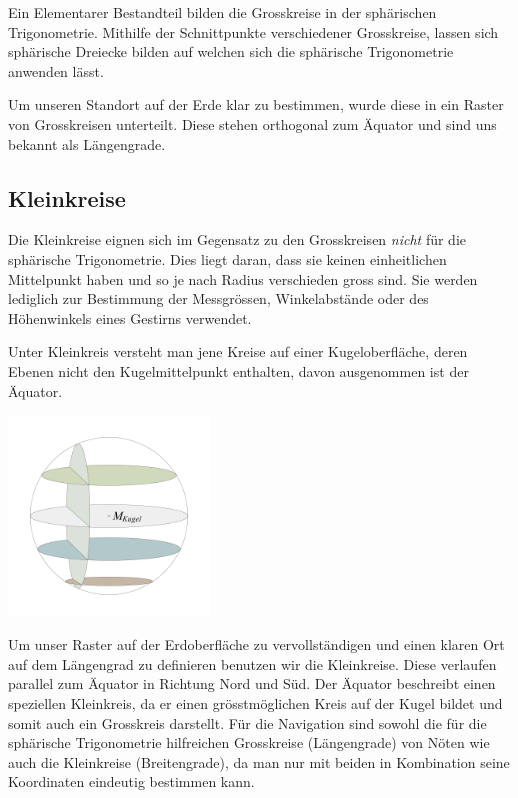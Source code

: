 \begin{refsection}
Ein Elementarer Bestandteil bilden die Grosskreise in der sphärischen Trigonometrie. Mithilfe der Schnittpunkte verschiedener Grosskreise, lassen sich sphärische Dreiecke bilden auf welchen sich die sphärische Trigonometrie anwenden lässt.

Um unseren Standort auf der Erde klar zu bestimmen, wurde diese in ein Raster von Grosskreisen unterteilt. Diese stehen orthogonal zum Äquator und sind uns bekannt als Längengrade.


\subsection{Kleinkreise}
Die Kleinkreise eignen sich im Gegensatz zu den Grosskreisen \textit{nicht} für die sphärische Trigonometrie.  Dies liegt daran, dass sie keinen einheitlichen Mittelpunkt haben und so je nach Radius verschieden gross sind.
Sie werden lediglich zur Bestimmung der Messgrössen, Winkelabstände oder des Höhenwinkels eines Gestirns verwendet. 

\begin{definition}
Unter Kleinkreis versteht man jene Kreise auf einer Kugeloberfläche, deren Ebenen nicht den Kugelmittelpunkt enthalten, davon ausgenommen ist der Äquator.
\label{skript:kugel:satz:Kleinkreis}
\end{definition} 

\begin{center}
        \includegraphics[width=0.4\textwidth]{kugel/Kleinkreise.jpg}
\end{center}

Um unser Raster auf der Erdoberfläche zu vervollständigen und einen klaren Ort auf dem Längengrad zu definieren benutzen wir die Kleinkreise. Diese verlaufen parallel zum Äquator in Richtung Nord und Süd. Der Äquator beschreibt einen speziellen Kleinkreis, da er einen grösstmöglichen Kreis auf der Kugel bildet und somit auch ein Grosskreis darstellt.
Für die Navigation sind sowohl die für die sphärische Trigonometrie hilfreichen Grosskreise (Längengrade) von Nöten wie auch die Kleinkreise (Breitengrade), da man nur mit beiden in Kombination seine Koordinaten eindeutig bestimmen kann.




\end{refsection}
